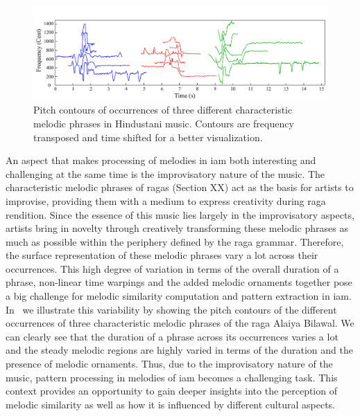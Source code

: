 \begin{figure}
	\begin{center}
		\includegraphics[width=\figSizeHundred]{ch01_introduction/figures/phraseClassesExample.pdf}
	\end{center}
	\caption{Pitch contours of occurrences of three different characteristic melodic phrases in Hindustani music. Contours are frequency transposed and time shifted for a better visualization.}
	\label{fig:phraseComplexityExample_intro}
\end{figure}

An aspect that makes processing of melodies in \gls{iam} both interesting and challenging at the same time is the improvisatory nature of the music. The characteristic melodic phrases of \glspl{raga} (Section XX) act as the basis for artists to improvise, providing them with a medium to express creativity during \gls{raga} rendition. Since the essence of this music lies largely in the improvisatory aspects, artists bring in novelty through creatively transforming these melodic phrases as much as possible within the periphery defined by the \gls{raga} grammar. Therefore, the surface representation of these melodic phrases vary a lot across their occurrences. This high degree of variation in terms of the overall duration of a phrase, non-linear time warpings and the added melodic ornaments together pose a big challenge for melodic similarity computation and pattern extraction in \gls{iam}. In~ we illustrate this variability by showing the pitch contours of the different occurrences of three characteristic melodic phrases of the \gls{raga} Alaiya Bilawal. We can clearly see that the duration of a phrase across its occurrences varies a lot and the steady melodic regions are highly varied in terms of the duration and the presence of melodic ornaments. Thus, due to the improvisatory nature of the music, pattern processing in melodies of \gls{iam} becomes a challenging task. This context provides an opportunity to gain deeper insights into the perception of melodic similarity as well as how it is influenced by different cultural aspects. 

